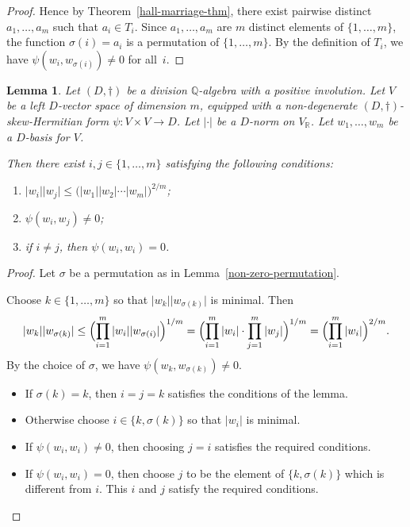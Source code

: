 \documentclass[JEP,XML,SOM,Unicode,NoFloatCountersInSection]{cedram}
\newenvironment{enumeratei}
{\bgroup\def\theenumi{\roman{enumi}}\def\theenumii{\alph{enumii}}\begin{enumerate}}
{\end{enumerate}\egroup}
\newcommand{\bQ}{\mathbb{Q}}
\newcommand{\bR}{\mathbb{R}}
\newcommand{\abs}[1]{\lvert #1 \rvert}
\newtheorem{lemma}{Lemma}[section]
\begin{document}
\begin{proof}
Hence by Theorem~\ref{hall-marriage-thm}, there exist pairwise distinct $a_1, \dotsc, a_m$ such that $a_i \in T_i$. Since $a_1, \dotsc, a_m$ are $m$ distinct elements of $\{1, \dotsc, m \}$, the function $\sigma(i) = a_i$ is a permutation of $\{ 1, \dotsc, m \}$.
By the definition of $T_i$, we have $\psi(w_i, w_{\sigma(i)}) \neq 0$ for all~$i$.
\end{proof}

\begin{lemma} \label{short-non-degenerate-vectors}
Let $(D,\dag)$ be a division $\bQ$-algebra with a positive involution.
Let $V$ be a left $D$-vector space of dimension $m$, equipped with a non-degenerate $(D,\dag)$-skew-Hermitian form $\psi \colon V \times V \to D$.
Let $\abs{\cdot}$ be a $D$-norm on $V_\bR$.
Let $w_1, \dotsc, w_m$ be a $D$-basis for $V$.

Then there exist $i,j \in \{ 1, \dotsc, m \}$ satisfying the following conditions:
\begin{enumeratei}
\item $\abs{w_i}\abs{w_j} \leq \bigl( \abs{w_1} \abs{w_2} \dotsm \abs{w_m} \bigr)^{2/m}$;
\item $\psi(w_i, w_j) \neq 0$;
\item if $i \neq j$, then $\psi(w_i,w_i) = 0$.
\end{enumeratei}
\end{lemma}

\begin{proof}
Let $\sigma$ be a permutation as in Lemma~\ref{non-zero-permutation}.

Choose $k \in \{ 1, \dotsc, m \}$ so that $\abs{w_k} \abs{w_{\sigma(k)}}$ is minimal.
Then
\[
\abs{w_k} \abs{w_{\sigma(k)}}
\leq \Bigl( \prod_{i=1}^m\, \abs{w_i} \abs{w_{\sigma(i)}} \Bigr)^{1/m}
= \Bigl( \prod_{i=1}^m\, \abs{w_i} \cdot \prod_{j=1}^m\, \abs{w_j} \Bigr)^{1/m}
= \Bigl( \prod_{i=1}^m\, \abs{w_i} \Bigr)^{2/m}.
\]
By the choice of $\sigma$, we have $\psi(w_k, w_{\sigma(k)}) \neq 0$.

\begin{itemize}
\item
If $\sigma(k) = k$, then $i=j=k$ satisfies the conditions of the lemma.

\item
Otherwise choose $i \in \{ k, \sigma(k) \}$ so that $\abs{w_i}$ is minimal.

\item
If $\psi(w_i, w_i) \neq 0$, then choosing $j=i$ satisfies the required conditions.

\item
If $\psi(w_i, w_i) = 0$, then choose $j$ to be the element of $\{ k, \sigma(k) \}$ which is different from $i$.
This $i$ and $j$ satisfy the required conditions.\qedhere
\end{itemize}
\end{proof}
\end{document}
